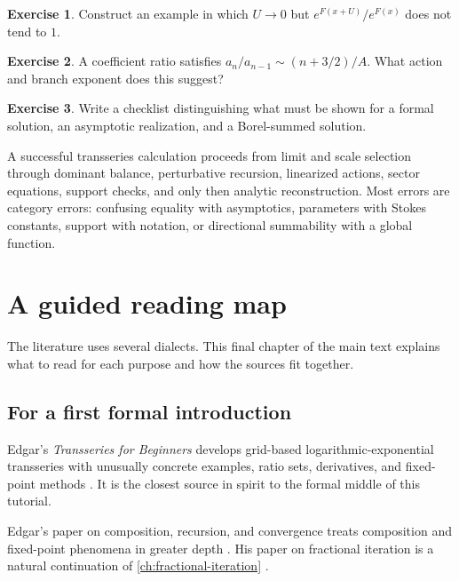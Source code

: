 \documentclass[11pt,openany]{book}
\theoremstyle{definition}
\newtheorem{exercise}{Exercise}[chapter]
\theoremstyle{plain}
\theoremstyle{remark}
\begin{document}
\begin{exercise}
Construct an example in which $U\to0$ but $e^{F(x+U)}/e^{F(x)}$ does not tend to $1$.
\end{exercise}

\begin{exercise}
A coefficient ratio satisfies $a_n/a_{n-1}\sim(n+3/2)/A$. What action and branch exponent does this suggest?
\end{exercise}

\begin{exercise}
Write a checklist distinguishing what must be shown for a formal solution, an asymptotic realization, and a Borel-summed solution.
\end{exercise}

\begin{summarybox}
A successful transseries calculation proceeds from limit and scale selection through dominant balance, perturbative recursion, linearized actions, sector equations, support checks, and only then analytic reconstruction. Most errors are category errors: confusing equality with asymptotics, parameters with Stokes constants, support with notation, or directional summability with a global function.
\end{summarybox}


\chapter{A guided reading map}\label{ch:reading-map}

The literature uses several dialects. This final chapter of the main text explains what to read for each purpose and how the sources fit together.

\section{For a first formal introduction}

Edgar's \emph{Transseries for Beginners} develops grid-based logarithmic-exponential transseries with unusually concrete examples, ratio sets, derivatives, and fixed-point methods \cite{edgar-beginners}. It is the closest source in spirit to the formal middle of this tutorial.

Edgar's paper on composition, recursion, and convergence treats composition and fixed-point phenomena in greater depth \cite{edgar-composition}. His paper on fractional iteration is a natural continuation of \cref{ch:fractional-iteration} \cite{edgar-fractional}.
\end{document}

